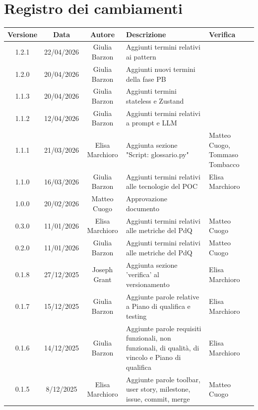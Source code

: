 \documentclass[11pt,a4paper]{article}
\begin{document}
\section*{Registro dei cambiamenti}

\begin{table}[H]
    \centering
    \begin{tabular}{|c|c|c|>{\raggedright\arraybackslash}p{}|p{}|}
        \hline
        \textbf{Versione} & \textbf{Data} & \textbf{Autore} & \textbf{Descrizione} & \textbf{Verifica} \\
        \hline
        1.2.1 & 22/04/2026 & Giulia Barzon & Aggiunti termini relativi ai pattern & \\
        \hline
        1.2.0 & 20/04/2026 & Giulia Barzon & Aggiunti nuovi termini della fase PB & \\
        \hline
        1.1.3 & 20/04/2026 & Giulia Barzon & Aggiunti termini stateless e Zustand & \\
        \hline
        1.1.2 & 12/04/2026 & Giulia Barzon & Aggiunti termini relativi a prompt e LLM & \\
        \hline
        1.1.1 & 21/03/2026 & Elisa Marchioro & Aggiunta sezione "Script: glossario.py" & Matteo Cuogo, Tommaso Tombacco\\
        \hline
        1.1.0 & 16/03/2026 & Giulia Barzon & Aggiunti termini relativi alle tecnologie del POC & Elisa Marchioro\\
        \hline
        1.0.0 & 20/02/2026 & Matteo Cuogo & Approvazione documento & \\
        \hline
        0.3.0 & 11/01/2026 & Elisa Marchioro & Aggiunti termini relativi alle metriche del PdQ & Matteo Cuogo \\
        \hline
        0.2.0 & 11/01/2026 & Giulia Barzon & Aggiunti termini relativi alle metriche del PdQ &  Matteo Cuogo\\
        \hline
        0.1.8 & 27/12/2025 & Joseph Grant & Aggiunta sezione 'verifica' al versionamento & Elisa Marchioro\\
        \hline
        0.1.7 & 15/12/2025 & Giulia Barzon & Aggiunte parole relative a Piano di qualifica e testing & Elisa Marchioro\\
        \hline
        0.1.6 & 14/12/2025 & Giulia Barzon & Aggiunte parole requisiti funzionali, non funzionali, di qualità, di vincolo e Piano di qualifica & Elisa Marchioro\\
        \hline
        0.1.5 & 8/12/2025 & Elisa Marchioro & Aggiunte parole toolbar, user story, milestone, issue, commit, merge & Matteo Cuogo\\

\end{tabular}
\end{table}
\end{document}
